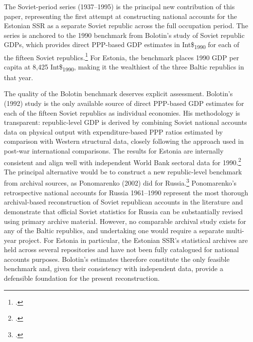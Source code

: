\documentclass[12pt,a4paper]{article}
\newcommand{\intlnineteen}{Int\$\textsubscript{1990}}   %
\begin{document}
The Soviet-period series (1937--1995) is the principal new contribution of this paper, representing the first attempt at constructing national accounts for the Estonian SSR as a separate Soviet republic across the full occupation period. The series is anchored to the 1990 benchmark from Bolotin's study of Soviet republic GDPs, which provides direct PPP-based GDP estimates in \intlnineteen{} for each of the fifteen Soviet republics.\footnote{\autocite{bolotin1992}.} For Estonia, the benchmark places 1990 GDP per capita at 8,425 \intlnineteen{}, making it the wealthiest of the three Baltic republics in that year.

The quality of the Bolotin benchmark deserves explicit assessment. Bolotin's (1992) study is the only available source of direct PPP-based GDP estimates for each of the fifteen Soviet republics as individual economies. His methodology is transparent: republic-level GDP is derived by combining Soviet national accounts data on physical output with expenditure-based PPP ratios estimated by comparison with Western structural data, closely following the approach used in post-war international comparisons. The results for Estonia are internally consistent and align well with independent World Bank sectoral data for 1990.\footnote{\autocite{wbstatisticalhandbook1994}.} The principal alternative would be to construct a new republic-level benchmark from archival sources, as Ponomarenko (2002) did for Russia.\footnote{\autocite{ponomarenko2002}.} Ponomarenko's retrospective national accounts for Russia 1961--1990 represent the most thorough archival-based reconstruction of Soviet republican accounts in the literature and demonstrate that official Soviet statistics for Russia can be substantially revised using primary archive material. However, no comparable archival study exists for any of the Baltic republics, and undertaking one would require a separate multi-year project. For Estonia in particular, the Estonian SSR's statistical archives are held across several repositories and have not been fully catalogued for national accounts purposes. Bolotin's estimates therefore constitute the only feasible benchmark and, given their consistency with independent data, provide a defensible foundation for the present reconstruction.
\end{document}
